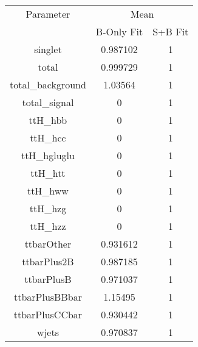 \begin{table}
\centering

\begin{tabular}{ccc}
\toprule
Parameter 	& \multicolumn{2}{c}{Mean}\\
 	& B-Only Fit & S+B Fit\\
\midrule
singlet 	& \num{0.987102} 	& \num{1}\\
total 	& \num{0.999729} 	& \num{1}\\
total\_background 	& \num{1.03564} 	& \num{1}\\
total\_signal 	& \num{0} 	& \num{1}\\
ttH\_hbb 	& \num{0} 	& \num{1}\\
ttH\_hcc 	& \num{0} 	& \num{1}\\
ttH\_hgluglu 	& \num{0} 	& \num{1}\\
ttH\_htt 	& \num{0} 	& \num{1}\\
ttH\_hww 	& \num{0} 	& \num{1}\\
ttH\_hzg 	& \num{0} 	& \num{1}\\
ttH\_hzz 	& \num{0} 	& \num{1}\\
ttbarOther 	& \num{0.931612} 	& \num{1}\\
ttbarPlus2B 	& \num{0.987185} 	& \num{1}\\
ttbarPlusB 	& \num{0.971037} 	& \num{1}\\
ttbarPlusBBbar 	& \num{1.15495} 	& \num{1}\\
ttbarPlusCCbar 	& \num{0.930442} 	& \num{1}\\
wjets 	& \num{0.970837} 	& \num{1}\\
\bottomrule
\end{tabular}
\end{table}